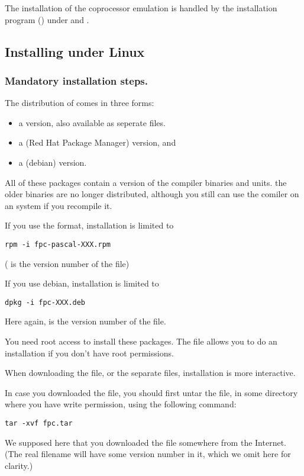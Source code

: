 \documentclass{book}
\begin{document}
The installation of the coprocessor emulation is handled by the
installation program () under \dos and \windows.

%
%
\subsection{Installing under Linux}
\subsubsection{Mandatory installation steps.}
The \linux distribution of \fpc comes in three forms:
\begin{itemize}
\item a  version, also available as seperate files.
\item a  (Red Hat Package Manager) version, and
\item a  (debian) version.
\end{itemize}
All of these packages contain a  version of the compiler binaries and
units. the older  binaries are no longer distributed, although you
still can use the comiler on an  system if you recompile it.

If you use the  format, installation is limited to
\begin{verbatim}
rpm -i fpc-pascal-XXX.rpm
\end{verbatim}
( is the version number of the  file)

If you use debian, installation is limited to
\begin{verbatim}
dpkg -i fpc-XXX.deb
\end{verbatim}
Here again,  is the version number of the  file.

You need root access to install these packages. The  file
allows you to do an installation if you don't have root permissions.

When downloading the  file, or the separate files,
 installation is more interactive.

In case you downloaded the  file, you should first untar
the file, in some directory where
you have write permission, using the following command:
\begin{verbatim}
tar -xvf fpc.tar
\end{verbatim}
We supposed here that you downloaded the file  somewhere
from the Internet. (The real filename will have some version number in it,
which we omit here for clarity.)
\end{document}
